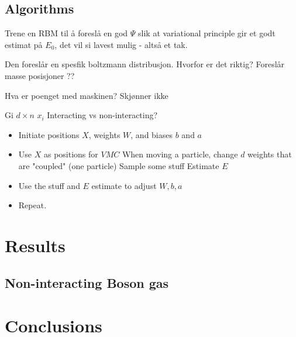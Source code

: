 \documentclass[%
oneside,                 %
final,                   %
10pt]{article}
\begin{document}
\subsection{Algorithms}
Trene en RBM til å foreslå en god $\Psi$ slik at variational principle gir et godt estimat på $E_0$, det vil si lavest mulig - altså et tak. 

Den foreslår en spesfik boltzmann distribusjon. Hvorfor er det riktig? Foreslår masse posisjoner ??

Hva er poenget med maskinen? Skjønner ikke

Gi $d \times n$ $x_i$ 
Interacting vs non-interacting?
\begin{itemize}
\item Initiate positions $X$, weights $W$, and biases $b$ and $a$
\item Use $X$ as positions for $VMC$
\subitem When moving a particle, change $d$ weights that are "coupled" (one particle)
\subitem Sample some stuff
\subitem Estimate $E$
\item Use the stuff and $E$ estimate to adjust $W,b,a$
\item Repeat.
\end{itemize}



\section{Results} \label{results}
\subsection{Non-interacting Boson gas}

\section{Conclusions} \label{conclusions}


 \label{refer}

\end{document}
